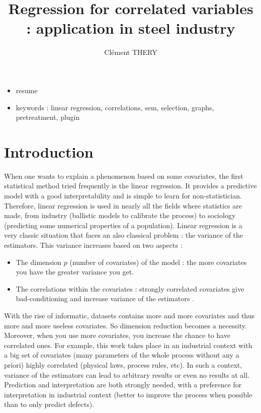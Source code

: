 \documentclass[11pt,a4paper]{article}
\author{Clément THERY}
\title{Regression for correlated variables : application in steel industry}
\begin{document}
\maketitle
	\begin{itemize}
		\item resume
		\item keywords : linear regression, correlations, sem, selection, graphs, pretreatment, plugin
	\end{itemize}
\section{Introduction}


When one wants to explain a phenomenon based on some covariates, the first statistical method tried frequently is the linear regression. It provides a predictive model with a good interpretability and is simple to learn for non-statistician. Therefore, linear regression is used in nearly all the fields where statistics are made, from industry (ballistic models to calibrate the process) to sociology (predicting some numerical properties of a population).
Linear regression is a very classic situation that faces an also classical problem : the variance of the estimators.
This variance increases based on two aspects :
\begin{itemize}
	\item The dimension $p$ (number of covariates) of the model  : the more covariates you have the greater variance you get.
	\item The correlations within the covariates : strongly correlated covariates give bad-conditioning and increase variance of the estimators .
\end{itemize}

	With the rise of informatic, datasets contains more and more covariates and thus more and more useless covariates. So dimension reduction becomes a necessity. Moreover, when you use more covariates, you increase the chance to have correlated ones. For example, this work takes place in an industrial context with a big set of covariates (many parameters of the whole process without any a priori) highly correlated (physical laws, process rules, etc). In such a context, variance of the estimators can lead to arbitrary results or even no results at all. Prediction and interpretation are both strongly needed, with a preference for interpretation in industrial context (better to improve the process when possible than to only predict defects).
	
\end{document}
